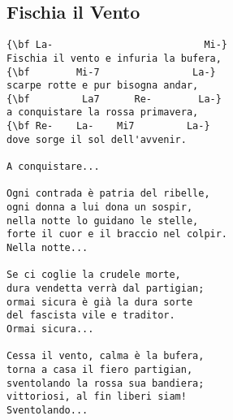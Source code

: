 \documentclass[a4paper]{article}
\begin{document}
\subsection{Fischia il Vento} %
\label{sub:Fischia il Vento}
\begin{Verbatim}[commandchars=\\\{\}]
{\bf La-                          Mi-}
Fischia il vento e infuria la bufera,
{\bf        Mi-7                La-}
scarpe rotte e pur bisogna andar,
{\bf         La7      Re-        La-}
a conquistare la rossa primavera,
{\bf Re-    La-    Mi7         La-}
dove sorge il sol dell'avvenir.

A conquistare...

Ogni contrada è patria del ribelle,
ogni donna a lui dona un sospir,
nella notte lo guidano le stelle,
forte il cuor e il braccio nel colpir.
Nella notte...

Se ci coglie la crudele morte,
dura vendetta verrà dal partigian;
ormai sicura è già la dura sorte
del fascista vile e traditor.
Ormai sicura...

Cessa il vento, calma è la bufera,
torna a casa il fiero partigian,
sventolando la rossa sua bandiera;
vittoriosi, al fin liberi siam!
Sventolando...

\end{Verbatim}
\newpage
\end{document}
